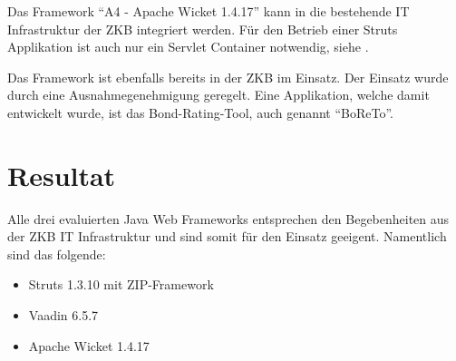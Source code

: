 Das Framework ``A4 - Apache Wicket 1.4.17'' kann in die bestehende IT
Infrastruktur der \ac{ZKB} integriert werden. Für den Betrieb einer Struts
Applikation ist auch nur ein Servlet Container notwendig, siehe
\cite{WicketDokumentation}.

Das Framework ist ebenfalls bereits in der \ac{ZKB} im Einsatz. Der Einsatz
wurde durch eine Ausnahmegenehmigung geregelt. Eine Applikation, welche damit
entwickelt wurde, ist das Bond-Rating-Tool, auch genannt ``BoReTo''.

\section{Resultat}

Alle drei evaluierten Java Web Frameworks entsprechen den Begebenheiten aus der
\ac{ZKB} IT Infrastruktur und sind somit für den Einsatz geeigent. Namentlich
sind das folgende:

\begin{itemize}
  \item Struts 1.3.10 mit ZIP-Framework
  \item Vaadin 6.5.7
  \item Apache Wicket 1.4.17
\end{itemize}